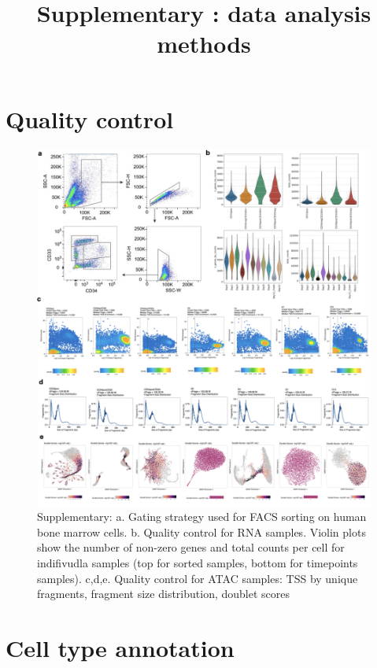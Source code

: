 \documentclass[a4paper]{article}
\begin{document}
\title{Supplementary : data analysis methods}
\maketitle

\tableofcontents

\section{Quality control}
\begin{figure}[!htb]
  \centering
  \includegraphics[width=\textwidth]{../figures/manuscript_panels/QC_supplementary.png}
  \caption{Supplementary: a. Gating strategy used for FACS sorting on human bone marrow cells. b. Quality control for RNA samples. Violin plots show the number of non-zero  genes and total counts per cell for indifivudla samples (top for sorted samples, bottom for timepoints samples). c,d,e. Quality control for ATAC samples: TSS by unique fragments, fragment size distribution, doublet scores}
\end{figure}

\FloatBarrier
\section{Cell type annotation}
\end{document}
